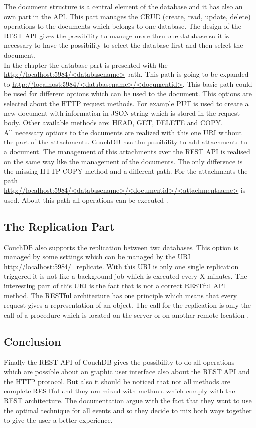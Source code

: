 The document structure is a central element of the database and it has also an own part in the API. This part manages the CRUD (create, read, update, delete) operations to the documents which belongs to one database. The design of the REST API gives the possibility to manage more then one database so it is necessary to have the possibility to select the database first and then select the document. \\
In the chapter  the database part is presented with the \url{http://localhost:5984/<databasename>} path. This path is going to be expanded to \url{http://localhost:5984/<databasename>/<documentid>}. This basic path could be used for different options which can be used to the document. This options are selected about the HTTP request methods. For example PUT is used to create a new document with information in JSON string which is stored in the request body. Other available methods are: HEAD, GET, DELETE and COPY.  \\
All necessary options to the documents are realized with this one URI without the part of the attachments. CouchDB has the possibility to add attachments to a document. The management of this attachments over the REST API is realised on the same way like the management of the documents. The only difference is the missing HTTP COPY method and a different path. For the attachments the path \url{http://localhost:5984/<databasename>/<documentid>/<attachmentname>} is used. About this path all operations can be executed \cite{CouchDBRestDocuments}.

\subsection{The Replication Part}

CouchDB also supports the replication between two databases. This option is managed by some settings which can be managed by the URI \url{http://localhost:5984/_replicate}. With this URI is only one single replication triggered it is not like a background job which is executed every X minutes. The interesting part of this URI is the fact that is not a correct RESTful API method. The RESTful architecture has one principle which means that every request gives a representation of an object. The call for the replication is only the call of a procedure which is located on the server or on another remote location \cite{CouchDBRestReplication}.

\subsection{Conclusion}

Finally the REST API of CouchDB gives the possibility to do all operations which are possible about an graphic user interface also about the REST API and the HTTP protocol. But also it should be noticed that not all methods are complete RESTful and they are mixed with methods which comply with the REST architecture. 
The documentation argue with the fact that they want to use the optimal technique for all events and so they decide to mix both ways together to give the user a better experience. 

